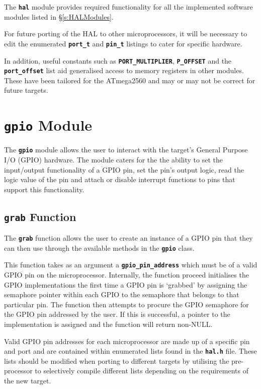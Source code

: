 \documentclass[a4paper, oneside, 11pt, titlepage, onecolumn, openright]{report}
\begin{document}
			The \textbf{\texttt{hal}} module provides required functionality for all the implemented software modules listed in \S\ref{s:HALModules}.
			
			For future porting of the HAL to other microprocessors, it will be necessary to edit the enumerated \textbf{\texttt{port\_t}} and \textbf{\texttt{pin\_t}} listings to cater for specific hardware.
			
			In addition, useful constants such as \textbf{\texttt{PORT\_MULTIPLIER}}, \textbf{\texttt{P\_OFFSET}} and the \textbf{\texttt{port\_offset}} list aid generalised access to memory registers in other modules. These have been tailored for the ATmega2560 and may or may not be correct for future targets.

\section{\textbf{\texttt{gpio}} Module}
			\label{s:HALgpioModule}
			The \textbf{\texttt{gpio}} module allows the user to interact with the target's General Purpose I/O (GPIO) hardware. The module caters for the the ability to set the input/output functionality of a GPIO pin, set the pin's output logic, read the logic value of the pin and attach or disable interrupt functions to pins that support this functionality.

\subsection{\textbf{\texttt{grab}} Function}
			\label{ss:HALgrabFunction}
			The \textbf{\texttt{grab}} function allows the user to create an instance of a GPIO pin that they can then use through the available methods in the \textbf{\texttt{gpio}} class. 
			
			This function takes as an argument a \textbf{\texttt{gpio\_pin\_address}} which must be of a valid GPIO pin on the microprocessor. Internally, the function proceed initialises the GPIO implementations the first time a GPIO pin is `grabbed' by assigning the semaphore pointer within each GPIO to the semaphore that belongs to that particular pin. The function then attempts to procure the GPIO semaphore for the GPIO pin addressed by the user. If this is successful, a pointer to the implementation is assigned and the function will return non-NULL.
			
			Valid GPIO pin addresses for each microprocessor are made up of a specific pin and port and are contained within enumerated lists found in the \textbf{\texttt{hal.h}} file. These lists should be modified when porting to different targets by utilising the pre-processor to selectively compile different lists depending on the requirements of the new target.  			
\end{document}
